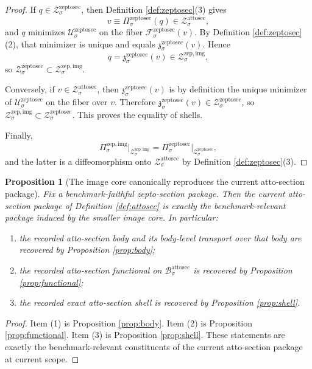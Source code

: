 \documentclass[11pt]{article}
\newcommand{\AttoSectionBody}[1]{\mathcal B_{#1}^{\mathrm{attosec}}}
\newcommand{\AttoSectionShell}[1]{\mathcal Z_{#1}^{\mathrm{attosec}}}
\newcommand{\ZeptoSectionProj}[1]{\Pi_{#1}^{\mathrm{zeptosec}}}
\newcommand{\ZeptoSectionFiber}[2]{\mathcal F_{#1}^{\mathrm{zeptosec}}(#2)}
\newcommand{\ZeptoSectionAttoMin}[1]{\mathfrak z_{#1}^{\mathrm{zeptosec}}}
\newcommand{\ZeptoSectionFunctional}[1]{\mathscr U_{#1}^{\mathrm{zeptosec}}}
\newcommand{\ZeptoSectionShell}[1]{\mathcal Z_{#1}^{\mathrm{zeptosec}}}
\newcommand{\ZeptoImgProj}[1]{\Pi_{#1}^{\mathrm{zep,img}}}
\newcommand{\ZeptoImgShell}[1]{\mathcal Z_{#1}^{\mathrm{zep,img}}}
\newtheorem{proposition}{Proposition}
\begin{document}
\begin{proof}
If \(q\in\ZeptoSectionShell{\sigma}\), then Definition \ref{def:zeptosec}(3) gives
\[
v\equiv \ZeptoSectionProj{\sigma}(q)\in\AttoSectionShell{\sigma},
\]
and \(q\) minimizes \(\ZeptoSectionFunctional{\sigma}\) on the fiber \(\ZeptoSectionFiber{\sigma}{v}\). By Definition \ref{def:zeptosec}(2), that minimizer is unique and equals \(\ZeptoSectionAttoMin{\sigma}(v)\). Hence
\[
q=\ZeptoSectionAttoMin{\sigma}(v)\in\ZeptoImgShell{\sigma},
\]
so \(\ZeptoSectionShell{\sigma}\subset\ZeptoImgShell{\sigma}\).

Conversely, if \(v\in\AttoSectionShell{\sigma}\), then \(\ZeptoSectionAttoMin{\sigma}(v)\) is by definition the unique minimizer of \(\ZeptoSectionFunctional{\sigma}\) on the fiber over \(v\). Therefore \(\ZeptoSectionAttoMin{\sigma}(v)\in\ZeptoSectionShell{\sigma}\), so \(\ZeptoImgShell{\sigma}\subset\ZeptoSectionShell{\sigma}\). This proves the equality of shells.

Finally,
\[
\ZeptoImgProj{\sigma}\big|_{\ZeptoImgShell{\sigma}}
=
\ZeptoSectionProj{\sigma}\big|_{\ZeptoSectionShell{\sigma}},
\]
and the latter is a diffeomorphism onto \(\AttoSectionShell{\sigma}\) by Definition \ref{def:zeptosec}(3).
\end{proof}

\begin{proposition}[The image core canonically reproduces the current atto-section package]
\label{prop:package}
Fix a benchmark-faithful zepto-section package. Then the current atto-section package of Definition \ref{def:attosec} is exactly the benchmark-relevant package induced by the smaller image core. In particular:
\begin{enumerate}
    \item the recorded atto-section body and its body-level transport over that body are recovered by Proposition \ref{prop:body};
    \item the recorded atto-section functional on \(\AttoSectionBody{\sigma}\) is recovered by Proposition \ref{prop:functional};
    \item the recorded exact atto-section shell is recovered by Proposition \ref{prop:shell}.
\end{enumerate}
\end{proposition}

\begin{proof}
Item (1) is Proposition \ref{prop:body}. Item (2) is Proposition \ref{prop:functional}. Item (3) is Proposition \ref{prop:shell}. These statements are exactly the benchmark-relevant constituents of the current atto-section package at current scope.
\end{proof}
\end{document}
